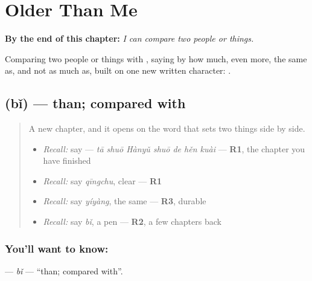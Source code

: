 
\chapter{Older Than Me}
\label{ch:zh-older-than-me}

\begin{chapteropening}
\textbf{By the end of this chapter:} \emph{I can compare two people or things.}

Comparing two people or things with , saying by how much, even more, the same as, and not as much as, built on one new written character: .
\end{chapteropening}

\section[\texorpdfstring{\zh{比} (bǐ)}{比 (bǐ)}]{ (bǐ) — than; compared with}

\label{lesson:ZH-C153-bi}



\begin{quote}
A new chapter, and it opens on the word that sets two things side by side.

\begin{itemize}
\raggedright
  \item \emph{Recall:} say  — \emph{tā shuō Hànyǔ shuō de hěn kuài} — \textbf{R1}, the chapter you have finished
  \item \emph{Recall:} say \emph{qīngchu}, clear — \textbf{R1}
  \item \emph{Recall:} say \emph{yíyàng}, the same — \textbf{R3}, durable
  \item \emph{Recall:} say \emph{bǐ}, a pen — \textbf{R2}, a few chapters back
\end{itemize}
\end{quote}

\subsection*{You'll want to know: }
\textbf{} — \emph{bǐ} — \textquotedblleft{}than; compared with\textquotedblright{}.


